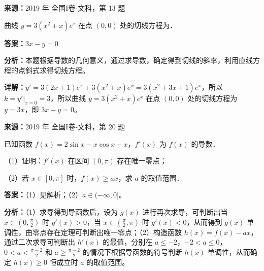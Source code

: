 \begin{question}[points=5]
\textbf{来源：}2019 年 全国I卷-文科，第 13 题\par
曲线 $y = 3(x^2+x)e^x$ 在点 $(0,0)$ 处的切线方程为．
\fillin[{$3x - y = 0$}]
\begin{solution}
\textbf{答案：}$3x - y = 0$

\textbf{分析：}本题根据导数的几何意义，通过求导数，确定得到切线的斜率，利用直线方程的点斜式求得切线方程。

\textbf{详解：}$y' = 3(2x+1)e^x + 3(x^2+x)e^x = 3(x^2+3x+1)e^x$，所以 $k = y'|_{x=0} = 3$，所以曲线 $y = 3(x^2+x)e^x$ 在点 $(0,0)$ 处的切线方程为 $y = 3x$，即 $3x - y = 0$。
\end{solution}
\end{question}

\begin{question}[points=12]
\textbf{来源：}2019 年 全国I卷-文科，第 20 题\par
已知函数 $f(x) = 2\sin x - x\cos x - x$，$f'(x)$ 为 $f(x)$ 的导数．

（1）证明：$f'(x)$ 在区间 $(0,\pi)$ 存在唯一零点；

（2）若 $x \in [0,\pi]$ 时，$f(x) \ge ax$，求 $a$ 的取值范围．
\begin{solution}
\textbf{答案：}（1）见解析；（2）$a \in (-\infty, 0]$。

\textbf{分析：}（1）求导得到导函数后，设为 $g(x)$ 进行再次求导，可判断出当 $x \in (0,\frac{\pi}{2})$ 时 $g'(x)>0$，当 $x \in (\frac{\pi}{2},\pi)$ 时 $g'(x)<0$，从而得到 $g(x)$ 单调性，由零点存在定理可判断出唯一零点；（2）构造函数 $h(x)=f(x)-ax$，通过二次求导可判断出 $h'(x)$ 的最值，分别在 $a \le -2$，$-2<a\le0$，$0<a<\frac{\pi-2}{2}$ 和 $a \ge \frac{\pi-2}{2}$ 的情况下根据导函数的符号判断 $h(x)$ 单调性，从而确定 $h(x)\ge0$ 恒成立时 $a$ 的取值范围。


\end{solution}
\end{question}
